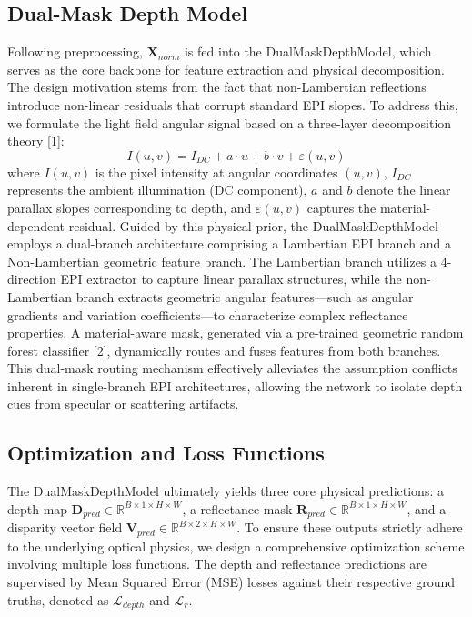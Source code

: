 \subsection{Dual-Mask Depth Model}

Following preprocessing, $\mathbf{X}_{norm}$ is fed into the DualMaskDepthModel, which serves as the core backbone for feature extraction and physical decomposition. The design motivation stems from the fact that non-Lambertian reflections introduce non-linear residuals that corrupt standard EPI slopes. To address this, we formulate the light field angular signal based on a three-layer decomposition theory [1]:
\begin{equation}
\label{eq:eq2}
I(u,v) = I_{DC} + a \cdot u + b \cdot v + \varepsilon(u,v)
\end{equation}
where $I(u,v)$ is the pixel intensity at angular coordinates $(u,v)$, $I_{DC}$ represents the ambient illumination (DC component), $a$ and $b$ denote the linear parallax slopes corresponding to depth, and $\varepsilon(u,v)$ captures the material-dependent residual. Guided by this physical prior, the DualMaskDepthModel employs a dual-branch architecture comprising a Lambertian EPI branch and a Non-Lambertian geometric feature branch. The Lambertian branch utilizes a 4-direction EPI extractor to capture linear parallax structures, while the non-Lambertian branch extracts geometric angular features—such as angular gradients and variation coefficients—to characterize complex reflectance properties. A material-aware mask, generated via a pre-trained geometric random forest classifier [2], dynamically routes and fuses features from both branches. This dual-mask routing mechanism effectively alleviates the assumption conflicts inherent in single-branch EPI architectures, allowing the network to isolate depth cues from specular or scattering artifacts.

\subsection{Optimization and Loss Functions}

The DualMaskDepthModel ultimately yields three core physical predictions: a depth map $\mathbf{D}_{pred} \in \mathbb{R}^{B \times 1 \times H \times W}$, a reflectance mask $\mathbf{R}_{pred} \in \mathbb{R}^{B \times 1 \times H \times W}$, and a disparity vector field $\mathbf{V}_{pred} \in \mathbb{R}^{B \times 2 \times H \times W}$. To ensure these outputs strictly adhere to the underlying optical physics, we design a comprehensive optimization scheme involving multiple loss functions. The depth and reflectance predictions are supervised by Mean Squared Error (MSE) losses against their respective ground truths, denoted as $\mathcal{L}_{depth}$ and $\mathcal{L}_{r}$. 

